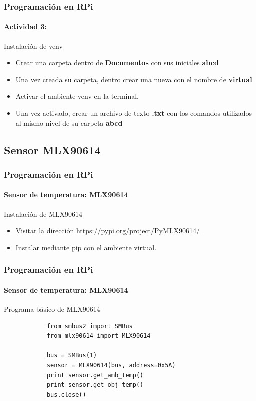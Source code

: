\documentclass{beamer}
\begin{document}
		\begin{frame}
		\frametitle{Programación en RPi}
		\framesubtitle{Actividad 3:}
		\begin{mybox}{Instalación de venv}
			\begin{itemize}
				\item Crear una carpeta dentro de \textbf{Documentos} con sus iniciales \textbf{abcd}
				\item Una vez creada su carpeta, dentro crear una nueva con el nombre de \textbf{virtual}
				\item Activar el ambiente venv en la terminal.
				\item Una vez activado, crear un archivo de texto \textbf{.txt} con los comandos utilizados al mismo nivel de su carpeta \textbf{abcd}
			\end{itemize}
		\end{mybox}
	\end{frame}
	\subsection{Sensor MLX90614}
	\begin{frame}
		\frametitle{Programación en RPi}
		\framesubtitle{Sensor de temperatura: MLX90614}
		
		\begin{mybox}{Instalación de MLX90614}
			\begin{itemize}
				\item Visitar la dirección \url{https://pypi.org/project/PyMLX90614/}
				\item Instalar mediante pip con el ambiente virtual.
			\end{itemize}
		\end{mybox}
		
	\end{frame}
	
	\begin{frame}[fragile]
		\frametitle{Programación en RPi}
		\framesubtitle{Sensor de temperatura: MLX90614}
		\begin{mybox}{Programa básico de MLX90614}
		\begin{lstlisting}
			from smbus2 import SMBus
			from mlx90614 import MLX90614
			
			bus = SMBus(1)
			sensor = MLX90614(bus, address=0x5A)
			print sensor.get_amb_temp()
			print sensor.get_obj_temp()
			bus.close()
		\end{lstlisting}
		\end{mybox}
	\end{frame}
	
\end{document}
